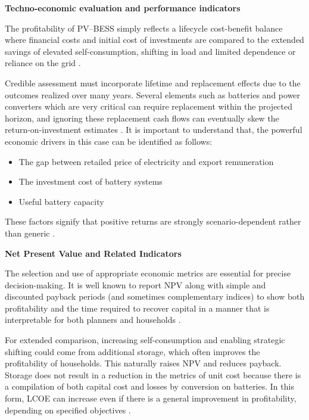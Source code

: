 \noindent\textbf{Techno-economic evaluation and performance indicators}\par

The profitability of PV--BESS simply reflects a lifecycle cost-benefit
balance where financial costs and initial cost of investments are compared
to the extended savings of elevated self-consumption, shifting in load and
limited dependence or reliance on the grid \cite{ch2ref001}.

Credible assessment must incorporate lifetime and replacement effects due
to the outcomes realized over many years. Several elements such as batteries
and power converters which are very critical can require replacement within
the projected horizon, and ignoring these replacement cash flows can
eventually skew the return-on-investment estimates \cite{ch2ref002}. It is
important to understand that, the powerful economic drivers in this case can
be identified as follows:

\begin{itemize}
    \item The gap between retailed price of electricity and export remuneration
    \item The investment cost of battery systems
    \item Useful battery capacity
\end{itemize}

These factors signify that positive returns are strongly scenario-dependent
rather than generic \cite{ch2ref003}.

\textbf{Net Present Value and Related Indicators}

The selection and use of appropriate economic metrics are essential for precise decision-making. It is well known to report NPV along with simple and discounted payback
periods (and sometimes complementary indices) to show both profitability and
the time required to recover capital in a manner that is interpretable for
both planners and households \cite{ch2ref006}.

For extended comparison, increasing self-consumption and enabling strategic
shifting could come from additional storage, which often improves the
profitability of households. This naturally raises NPV and reduces payback.
Storage does not result in a reduction in the metrics of unit cost because
there is a compilation of both capital cost and losses by conversion on
batteries. In this form, LCOE can increase even if there is a general
improvement in profitability, depending on specified objectives
\cite{ch2ref012}.

